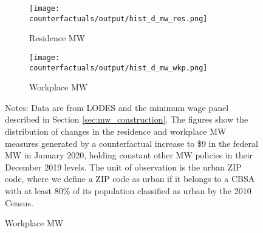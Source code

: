 \begin{figure}[h!]
    \centering
    \caption{Distribution of counterfactual increases in MW measures, 
             urban ZIP codes}
    \label{fig:cf_hist_res_and_wkp_mw}
    \begin{subfigure}{0.5\textwidth}
        \caption*{Residence MW}
        \texttt{[image: counterfactuals/output/hist\_d\_mw\_res.png]}
    \end{subfigure}%
    \begin{subfigure}{0.5\textwidth}
        \caption*{Workplace MW}
        \texttt{[image: counterfactuals/output/hist\_d\_mw\_wkp.png]}
    \end{subfigure}

    \begin{minipage}{.95\textwidth} \footnotesize
        \vspace{3mm}
        Notes:
        Data are from LODES and the minimum wage panel described in Section 
        \ref{sec:mw_construction}.
        The figures show the distribution of changes in the residence and 
        workplace MW measures generated by a counterfactual increase to \$9 
        in the federal MW in January 2020, holding constant other MW policies 
        in their December 2019 levels.
        The unit of observation is the urban ZIP code, where we define a ZIP code 
        as urban if it belongs to a CBSA with at least 80\% of its population 
        classified as urban by the 2010 Census.
    \end{minipage}
\end{figure}
